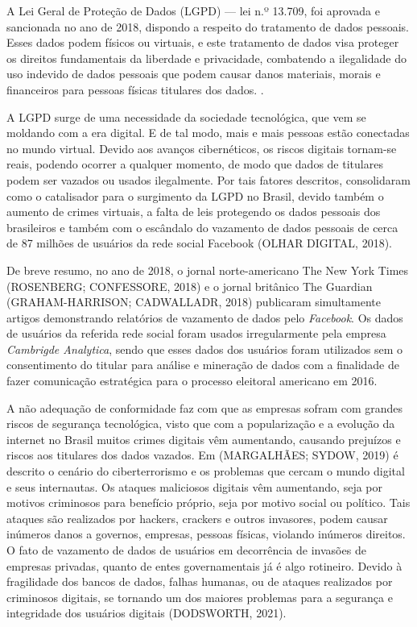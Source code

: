 \documentclass[
	12pt,				%
	openright,			%
	oneside,			%
	a4paper,			%
	english,			%
	french,				%
	spanish,			%
	brazil,				%
	]{abntex2}
\begin{document}
A Lei Geral de Proteção de Dados (LGPD) — lei n.º 13.709, foi aprovada e sancionada no ano de 2018, dispondo a respeito do tratamento de dados pessoais. Esses dados podem físicos ou virtuais, e este tratamento de dados visa proteger os direitos fundamentais da liberdade e privacidade, combatendo a ilegalidade do uso indevido de dados pessoais que podem causar danos materiais, morais e financeiros para pessoas físicas titulares dos dados. \cite{01-01-LeiGeral}.

A LGPD surge de uma necessidade da sociedade tecnológica, que vem se moldando com a era digital. E de tal modo, mais e mais pessoas estão conectadas no mundo virtual. Devido aos avanços cibernéticos, os riscos digitais tornam-se reais, podendo ocorrer a qualquer momento,  de modo que dados de titulares podem ser vazados ou usados ilegalmente. Por tais fatores descritos, consolidaram como o catalisador para o surgimento da LGPD no Brasil, devido também o aumento de crimes virtuais, a falta de leis protegendo os dados pessoais dos brasileiros e também com o escândalo do vazamento de dados pessoais de cerca de 87 milhões de usuários da rede social Facebook  (OLHAR DIGITAL, 2018).

De breve resumo, no ano de 2018, o jornal norte-americano The New York Times (ROSENBERG; CONFESSORE, 2018) e o jornal britânico The Guardian (GRAHAM-HARRISON; CADWALLADR, 2018) publicaram simultamente artigos demonstrando relatórios de vazamento de dados pelo \textit{Facebook}. Os  dados de usuários da referida rede social foram usados irregularmente pela empresa \textit{Cambrigde Analytica}, sendo que esses dados dos usuários foram utilizados sem o consentimento do titular para análise e mineração de dados com a finalidade de fazer comunicação estratégica para o processo eleitoral americano em 2016.

A não adequação de conformidade faz com que as empresas sofram com grandes riscos de segurança tecnológica, visto que com a popularização e a evolução da internet no Brasil muitos crimes digitais vêm aumentando, causando prejuízos e riscos aos titulares dos dados vazados. Em (MARGALHÃES; SYDOW, 2019) é descrito o cenário do ciberterrorismo e os problemas que cercam o mundo digital e seus internautas. Os ataques maliciosos digitais vêm aumentando, seja por motivos criminosos para benefício próprio, seja por motivo social ou político. Tais ataques são realizados por hackers, crackers e outros invasores, podem causar inúmeros danos a governos, empresas, pessoas físicas, violando inúmeros direitos. O fato de vazamento de dados de usuários em decorrência de invasões de empresas privadas, quanto de entes governamentais já é algo rotineiro. Devido à fragilidade dos bancos de dados, falhas humanas, ou de ataques realizados por criminosos digitais, se tornando um dos maiores problemas para a segurança e integridade dos usuários digitais (DODSWORTH, 2021).
\end{document}
